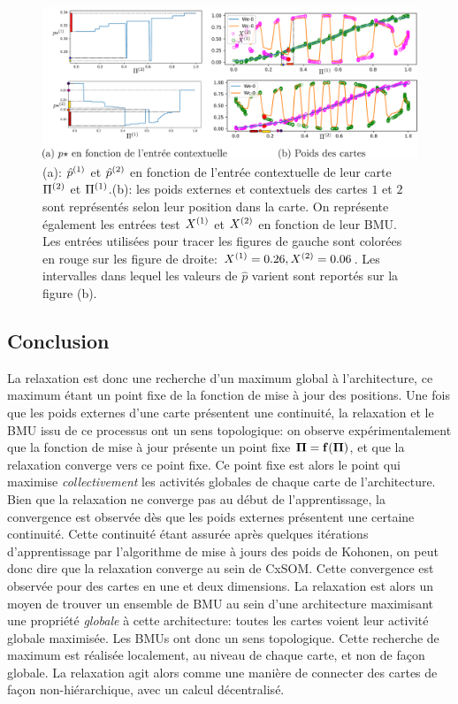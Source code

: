 \documentclass[../main]{subfiles}
\begin{document}
\begin{figure}
\includegraphics[width=\textwidth]{am_w_006}
\caption{(a): $\hat{p}^{({1})}$ et $\hat{p}^{({2})}$ en fonction de l'entrée contextuelle de leur carte $\Pi^{({2})}$ et $\Pi^{({1})}$.(b): les poids externes et contextuels des cartes $1$ et $2$ sont représentés selon leur position dans la carte. On représente également les entrées test $X^{({1})}$ et $X^{({2})}$ en fonction de leur BMU. Les entrées utilisées pour tracer les figures de gauche sont colorées en rouge sur les figure de droite: $X^{({1})}=0.26,X^{({2})}=0.06$. Les intervalles dans lequel les valeurs de $\hat{p}$ varient sont reportés sur la figure (b).}
\label{fig:w006}
\end{figure}

\subsection{Conclusion}
La relaxation est donc une recherche d'un maximum global à l'architecture, ce maximum étant un point fixe de la fonction de mise à jour des positions.
Une fois que les poids externes d'une carte présentent une continuité, la relaxation et le BMU issu de ce processus ont un sens topologique: on observe expérimentalement que la fonction de mise à jour présente un point fixe $\mathbf{\Pi} = \mathbf{f}(\mathbf{\Pi})$, et que la relaxation converge vers ce point fixe. Ce point fixe est alors le point qui maximise \emph{collectivement} les activités globales de chaque carte de l'architecture.
Bien que la relaxation ne converge pas au début de l'apprentissage, la convergence est observée dès que les poids externes présentent une certaine continuité. Cette continuité étant assurée après quelques itérations d'apprentissage par l'algorithme de mise à jours des poids de Kohonen, on peut donc dire que la relaxation converge au sein de CxSOM. Cette convergence est observée pour des cartes en une et deux dimensions.
La relaxation est alors un moyen de trouver un ensemble de BMU au sein d'une architecture maximisant une propriété \emph{globale} à cette architecture: toutes les cartes voient leur activité globale maximisée. Les BMUs ont donc un sens topologique. Cette recherche de maximum est réalisée localement, au niveau de chaque carte, et non de façon globale. La relaxation agit alors comme une manière de connecter des cartes de façon non-hiérarchique, avec un calcul décentralisé.

\ifSubfilesClassLoaded{
    \printbibliography
}{}
\end{document}
